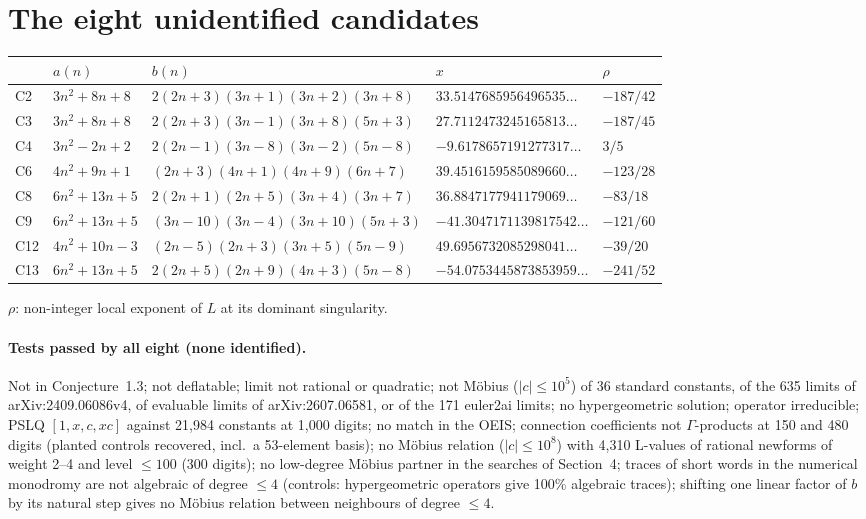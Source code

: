 \documentclass[11pt]{article}
\begin{document}
\section{The eight unidentified candidates}
\begin{center}{\small\begin{tabular}{lllll}\toprule
 & $a(n)$ & $b(n)$ & $x$ & $\rho$ \\\midrule
C2 & $3n^2+8n+8$ & $2(2n+3)(3n+1)(3n+2)(3n+8)$ & $33.5147685956496535\ldots$ & $-187/42$\\
C3 & $3n^2+8n+8$ & $2(2n+3)(3n-1)(3n+8)(5n+3)$ & $27.7112473245165813\ldots$ & $-187/45$\\
C4 & $3n^2-2n+2$ & $2(2n-1)(3n-8)(3n-2)(5n-8)$ & $-9.6178657191277317\ldots$ & $3/5$\\
C6 & $4n^2+9n+1$ & $(2n+3)(4n+1)(4n+9)(6n+7)$ & $39.4516159585089660\ldots$ & $-123/28$\\
C8 & $6n^2+13n+5$ & $2(2n+1)(2n+5)(3n+4)(3n+7)$ & $36.8847177941179069\ldots$ & $-83/18$\\
C9 & $6n^2+13n+5$ & $(3n-10)(3n-4)(3n+10)(5n+3)$ & $-41.3047171139817542\ldots$ & $-121/60$\\
C12 & $4n^2+10n-3$ & $(2n-5)(2n+3)(3n+5)(5n-9)$ & $49.6956732085298041\ldots$ & $-39/20$\\
C13 & $6n^2+13n+5$ & $2(2n+5)(2n+9)(4n+3)(5n-8)$ & $-54.0753445873853959\ldots$ & $-241/52$\\\bottomrule
\end{tabular}}\end{center}
$\rho$: non-integer local exponent of $L$ at its dominant singularity.

{\sloppy\paragraph{Tests passed by all eight (none identified).} Not in Conjecture~1.3; not deflatable; limit not rational or quadratic;
not M\"obius ($|c|\le10^5$) of 36 standard constants, of the 635 limits of arXiv:2409.06086v4, of evaluable limits of arXiv:2607.06581,
or of the 171 euler2ai limits; no hypergeometric solution; operator irreducible; PSLQ $[1,x,c,xc]$ against 21,984 constants at 1,000
digits; no match in the OEIS; connection coefficients not $\Gamma$-products at 150 and 480 digits (planted controls recovered,
incl.\ a 53-element basis); no M\"obius relation ($|c|\le10^8$) with 4,310 L-values of rational newforms of weight 2--4 and level
$\le100$ (300 digits); no low-degree M\"obius partner in the searches of Section~4; traces of short words in the numerical monodromy
are not algebraic of degree $\le4$ (controls: hypergeometric operators give 100\% algebraic traces); shifting one linear factor of
$b$ by its natural step gives no M\"obius relation between neighbours of degree $\le4$.\par}
\end{document}
